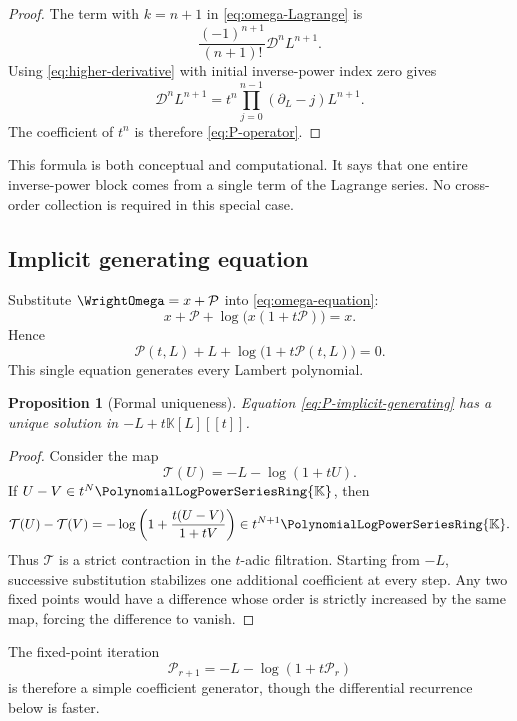 \documentclass[11pt]{article}
\theoremstyle{pltheorem}
\newtheorem{proposition}[theorem]{Proposition}
\newcommand{\K}{\mathbb K}
\newcommand{\PL}{\PolynomialLogPowerSeriesRing{\K}}
\newcommand{\D}{\mathcal D}
\begin{document}
\begin{proof}
The term with \(k=n+1\) in \cref{eq:omega-Lagrange} is
\[
 \frac{(-1)^{n+1}}{(n+1)!}\D^nL^{n+1}.
\]
Using \cref{eq:higher-derivative} with initial inverse-power index zero gives
\[
 \D^nL^{n+1}
 =t^n\prod_{j=0}^{n-1}(\partial_L-j)L^{n+1}.
\]
The coefficient of \(t^n\) is therefore \cref{eq:P-operator}.
\end{proof}

This formula is both conceptual and computational.  It says that one entire inverse-power block comes from a single term of the Lagrange series.  No cross-order collection is required in this special case.

\subsection{Implicit generating equation}

Substitute \(\WrightOmega=x+\mathcal P\) into \cref{eq:omega-equation}:
\[
 x+\mathcal P+\log\bigl(x(1+t\mathcal P)\bigr)=x.
\]
Hence
\begin{equation}\label{eq:P-implicit-generating}
 \boxed{\quad
 \mathcal P(t,L)+L+\log\bigl(1+t\mathcal P(t,L)\bigr)=0.
 \quad}
\end{equation}
This single equation generates every Lambert polynomial.

\begin{proposition}[Formal uniqueness]\label{prop:P-unique}
Equation \cref{eq:P-implicit-generating} has a unique solution in
\(-L+t\K[L][[t]]\).
\end{proposition}

\begin{proof}
Consider the map
\[
 \mathcal T(U)=-L-\log(1+tU).
\]
If \(U-V\in t^N\PL\), then
\[
 \mathcal T(U)-\mathcal T(V)
 =-\log\left(1+\frac{t(U-V)}{1+tV}\right)
 \in t^{N+1}\PL.
\]
Thus \(\mathcal T\) is a strict contraction in the \(t\)-adic filtration.  Starting from \(-L\), successive substitution stabilizes one additional coefficient at every step.  Any two fixed points would have a difference whose order is strictly increased by the same map, forcing the difference to vanish.
\end{proof}

The fixed-point iteration
\begin{equation}\label{eq:P-fixed-iteration}
 \mathcal P_{r+1}=-L-\log(1+t\mathcal P_r)
\end{equation}
is therefore a simple coefficient generator, though the differential recurrence below is faster.
\end{document}
